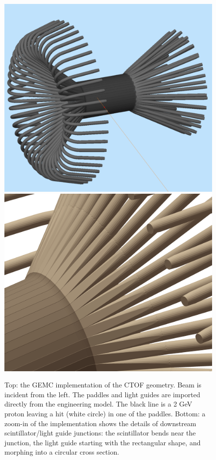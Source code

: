 \begin{figure}
	\centering
	\includegraphics[width=0.99\columnwidth,keepaspectratio]{img/ctofGeometry.png}
	\includegraphics[width=0.99\columnwidth,keepaspectratio]{img/ctofDetail.png}
	\caption{Top: the GEMC implementation of the CTOF geometry. Beam is incident from the left.
	         The paddles and light guides are imported directly from the engineering model.
			 The black line is a 2 GeV proton leaving a hit (white circle) in one of the paddles.
			 Bottom: a zoom-in of the implementation shows the details of downstream scintillator/light guide junctions:
			 the scintillator bends near the junction, the light guide starting with the rectangular shape,
			 and morphing into a circular cross section.}
	\label{fig:ctofGeometry}
\end{figure}


